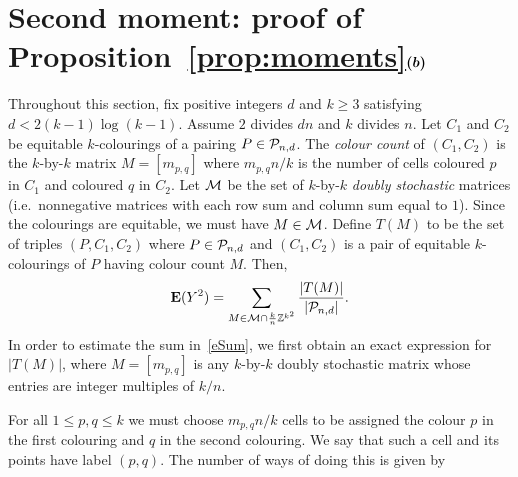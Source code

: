 \documentclass[12pt]{article}
\newcommand{\lab}[1]{\label{#1}}
\def\P{{\cal P}}
\def\ex{{\bf E}}
\def\BZ{{\mathbb Z}}
\def\Pnd{\P_{n,d}}
\def\be{\begin{equation}}
\def\ee{\end{equation}}
\newcommand{\bel}[1]{\be\lab{#1}}
\def\Z{\BZ}
\def\M{{\cal M}}
\newcommand{\mbf}[1] {\text{\boldmath$#1$}}
\begin{document}


\section{Second moment: proof of Proposition~\ref{prop:moments}$\mbf{(b)}$}
Throughout this section, fix positive integers $d$ and $k\ge 3$ satisfying $d<2(k-1)\log(k-1)$. Assume $2$ divides $dn$ and $k$ divides $n$.
Let $C_1$ and $C_2$ be equitable $k$-colourings of a pairing $P\in\Pnd$. 
The \emph{colour count} of $(C_1,C_2)$ is the $k$-by-$k$ matrix $M=[m_{p,q}]$
where $m_{p,q}n/k$ is the number of cells coloured $p$ in $C_1$ and coloured
$q$ in $C_2$. 
Let $\M$ be the
set of $k$-by-$k$ \emph{doubly stochastic} matrices (i.e.~nonnegative matrices with each row sum and column sum 
equal to $1$).
Since the colourings are equitable, we must have $M\in\M$.
Define $T(M)$ to be the set of 
triples $(P,C_1,C_2)$ where
$P\in\Pnd$ and $(C_1, C_2)$ is a pair of equitable $k$-colourings 
of $P$ having colour count $M$.
  Then,
%
\bel{eSum}
\ex(Y^2) = \sum_{M\in\M\cap\frac{k}{n}\Z^{k^2}}\frac{|T(M)|}{|\Pnd|}.
\ee
%
In order to estimate the sum in~\eqref{eSum}, we first obtain an exact expression for $|T(M)|$, where $M=[m_{p,q}]$ is any $k$-by-$k$ doubly stochastic matrix whose entries are integer multiples of $k/n$.

For all $1\le p,q \le k$ we must choose $m_{p,q}n/k$ cells to be assigned the
colour $p$ in the first colouring and $q$ in the second colouring. We say that
such a cell and its points have label $(p,q)$.
The number of ways of doing this is given by
\end{document}
